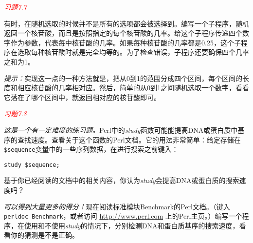 \textcolor{red}{\textit{习题7.7}}
\begin{adjustwidth}{4em}{}
有时，在随机选取的时候并不是所有的选项都会被选择到。编写一个子程序，随机返回一个核苷酸，而且是按照指定的每个核苷酸的几率。给这个子程序传递四个数字作为参数，代表每中核苷酸的几率。如果每种核苷酸的几率都是0.25，这个子程序在选取每种核苷酸时就是完全均等的。为了检查错误，子程序还要确保四个几率之和为1。

\textit{提示：}实现这一点的一种方法就是，把从0到1的范围分成四个区间，每个区间的长度和相应核苷酸的几率相对应。然后，简单的从0到1之间随机选取一个数字，看看它落在了哪个区间中，就返回相对应的核苷酸即可。
\end{adjustwidth}

\textcolor{red}{\textit{习题7.8}}
\begin{adjustwidth}{4em}{}
\textit{这是一个有一定难度的练习题。}Perl中的\textit{study}函数可能能提高DNA或蛋白质中基序的查找速度。查看关于这个函数的Perl文档。它的用法非常简单：给定存储在\verb|$sequence|变量中的一些序列数据，在进行搜索之前键入：

\begin{lstlisting}
study $sequence;
\end{lstlisting}

基于你已经阅读的文档中的相关内容，你认为\textit{study}会提高DNA或蛋白质的搜索速度吗？
\end{adjustwidth}

\textit{可以得到大量更多的得分！}现在阅读标准模块Benchmark的Perl文档。（键入\verb|perldoc Benchmark|，或者访问 \href{http://www.perl.com}{http://www.perl.com} 上的Perl主页。）编写一个程序，在使用和不使用\textit{study}的情况下，分别检测DNA和蛋白质基序的搜索速度，看看你的猜测是不是正确。
